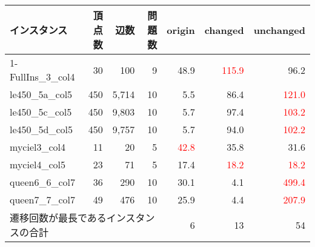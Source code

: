 \begin{tabular}{lrrr|rrr} \hline
  インスタンス & 頂点数 & 辺数 & 問題数 & origin & changed & unchanged \\ \hline
  1-FullIns\_3\_col4 & 30 & 100 & 9 & 48.9 & \textcolor{red}{115.9} & 96.2 \\   
  le450\_5a\_col5 & 450 & 5,714 & 10 & 5.5 & 86.4 & \textcolor{red}{121.0} \\ 
  le450\_5c\_col5 & 450 & 9,803 & 10 & 5.7 & 97.4 & \textcolor{red}{103.2} \\ 
  le450\_5d\_col5 & 450 & 9,757 & 10 & 5.7 & 94.0 & \textcolor{red}{102.2} \\ 
  myciel3\_col4 & 11 & 20 & 5 & \textcolor{red}{42.8} & 35.8 & 31.6 \\ 
  myciel4\_col5 & 23 & 71 & 5 & 17.4 & \textcolor{red}{18.2} & \textcolor{red}{18.2} \\ 
  queen6\_6\_col7 & 36 & 290 & 10 & 30.1 & 4.1 & \textcolor{red}{499.4} \\ 
  queen7\_7\_col7 & 49 & 476 & 10 & 25.9 & 4.4 & \textcolor{red}{207.9} \\ \hline
  \multicolumn{4}{l|}{遷移回数が最長であるインスタンスの合計} & 6 & 13 & 54 \\ \hline
\end{tabular}